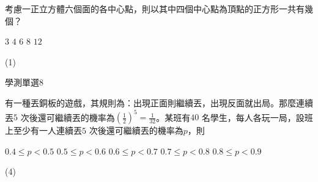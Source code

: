 \begin{QUESTIONS}
\begin{QUESTION}
\begin{ExamAnsRateInfo}{}{}{}{}
        \end{ExamAnsRateInfo}
        \begin{QBODY}
            考慮一正立方體六個面的各中心點，則以其中四個中心點為頂點的正方形一共有幾個？
            \begin{QOPS}
                \QOP $3$	
                \QOP $4$
                \QOP $6$	
                \QOP $8$
                \QOP $12$                
            \end{QOPS}
        \end{QBODY}
        \begin{QFROMS}
        \end{QFROMS}
        \begin{QTAGS}\end{QTAGS}
        \begin{QANS}
            (1)
        \end{QANS}
        \begin{QSOLLIST}
        \end{QSOLLIST}
        \begin{QEMPTYSPACE}
        \end{QEMPTYSPACE}
    \end{QUESTION}
    \begin{QUESTION}
        \begin{ExamInfo}{86}{學測}{單選}{8}
        \end{ExamInfo}
        \begin{ExamAnsRateInfo}{}{}{}{}
        \end{ExamAnsRateInfo}
        \begin{QBODY}
            有一種丟銅板的遊戲，其規則為：出現正面則繼續丟，出現反面就出局。那麼連續丟$5$ 次後還可繼續丟的機率為${{\left( \frac{1}{2} \right)}^{5}}=\frac{1}{32}$。某班有$40$ 名學生，每人各玩一局，設班上至少有一人連續丟$5$ 次後還可繼續丟的機率為$p$，則
            \begin{QOPS}
                \QOP $0.4\le p<0.5$	
                \QOP $0.5\le p<0.6$
                \QOP $0.6\le p<0.7$	
                \QOP $0.7\le p<0.8$
                \QOP $0.8\le p<0.9$
            \end{QOPS}
        \end{QBODY}
        \begin{QFROMS}
        \end{QFROMS}
        \begin{QTAGS}\end{QTAGS}
        \begin{QANS}
            (4)

\end{QANS}
\end{QUESTION}
\end{QUESTIONS}
